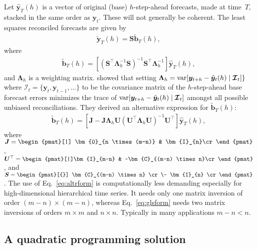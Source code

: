 \documentclass[11pt]{article}
\newcommand{\var}{\textnormal{var}}
\newcommand{\bS}{\bm{S}}
\newcommand{\bC}{\bm{C}}
\newcommand{\bI}{\bm{I}}
\newcommand{\0}{\phantom{0}}
\begin{document}
Let $\hat{\bm{y}}_T(h)$ is a vector of original (base) $h$-step-ahead forecasts, made at time~$T$, stacked in the same order as $\bm{y}_t$. These will not generally be coherent. The least squares reconciled forecasts are given by
\begin{align*}
	\tilde{\bm{y}}_{T}(h) = \bm{S}\tilde{\bm{b}}_{T}(h),
\end{align*}
where
\begin{align}
	\tilde{\bm{b}}_{T}(h) = \left[(\bm{S}^\top\bm{\Lambda}_{h}^{-1}\bm{S})^{-1}\bm{S}^\top\bm{\Lambda}_{h}^{-1}\right]\hat{\bm{y}}_{T}(h),
	\label{eq:glsform}
\end{align}
and $\bm{\Lambda}_h$ is a weighting matrix. \citet{Wick2018} showed that setting $\bm{\Lambda}_h =\var[\bm{y}_{t+h} - \hat{\bm{y}}_{t}(h)\mid\bm{\mathcal{I}}_{t}]\}$ where $\bm{\mathcal{I}}_t = \{\bm{y}_{t}, \bm{y}_{t-1}, \dots \}$ to be the covariance matrix of the $h$-step-ahead base forecast errors minimizes the trace of
$\var[\bm{y}_{t+h} - \tilde{\bm{y}}_{t}(h)\mid \bm{\mathcal{I}}_{t}]$ amongst all possible unbiased reconciliations. They derived an alternative expression for $\tilde{\bm{b}}_{T}(h)$:
\begin{align}
	\tilde{\bm{b}}_{T}(h) = \left[\bm{J} - \bm{J}\bm{\Lambda}_h\bm{U}(\bm{U}^\top\bm{\Lambda}_h\bm{U})^{-1}\bm{U}^\top\right]\hat{\bm{y}}_{T}(h),
	\label{eq:altrform}
\end{align}
where $\bm{J} = \begin{pmat}[|] \bm{0}_{n \times (m-n)} & \bI_{n}\cr\end{pmat}$,\quad
$\bm{U}^\top = \begin{pmat}[|]\bI_{m-n}  & -\bC_{(m-n) \times n}\cr\end{pmat}$,
and $\bS = \begin{pmat}[{}]
		\bC_{(m-n) \times n} \cr\-
		\bI_{n} \cr
	\end{pmat}$. The use of Eq.~\eqref{eq:altrform} is computationally less demanding especially for high-dimensional hierarchical time series. It needs only one matrix inversion of order $(m - n) \times (m - n)$, whereas Eq.~\eqref{eq:glsform} needs two matrix inversions of orders $m \times m$ and $n \times n$. Typically in many applications $m-n < n$.

\subsection{A quadratic programming solution}
\end{document}
